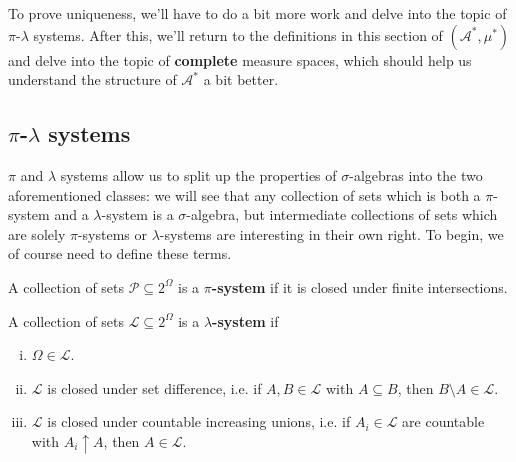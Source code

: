 To prove uniqueness, we'll have to do a bit more work and delve into the topic of $\pi$-$\lambda$ systems. After this, we'll return to the definitions in this section of $(\mathcal A^*, \mu^*)$ and delve into the topic of \textbf{complete} measure spaces, which should help us understand the structure of $\mathcal A^*$ a bit better. 

\subsection{$\pi$-$\lambda$ systems}

$\pi$ and $\lambda$ systems allow us to split up the properties of $\sigma$-algebras into the two aforementioned classes: we will see that any collection of sets which is both a $\pi$-system and a $\lambda$-system is a $\sigma$-algebra, but intermediate collections of sets which are solely $\pi$-systems or $\lambda$-systems are interesting in their own right. To begin, we of course need to define these terms.

\begin{definition}[$\pi$-system]
	A collection of sets $\mathcal P\subseteq 2^\Omega$ is a \textbf{$\pi$-system} if it is closed under finite intersections.
\end{definition}

\begin{definition}
	A collection of sets $\mathcal L\subseteq 2^\Omega$ is a \textbf{$\lambda$-system} if
	\begin{enumerate}[i)]
		\item $\Omega\in\mathcal L$.
		\item $\mathcal L$ is closed under set difference, i.e. if $A, B\in\mathcal L$ with $A\subseteq B$, then $B\setminus A\in\mathcal L$. 
		\item $\mathcal L$ is closed under countable increasing unions, i.e. if $A_i\in\mathcal L$ are countable with $A_i\uparrow A$, then $A\in\mathcal L$. 
	\end{enumerate}
\end{definition}

